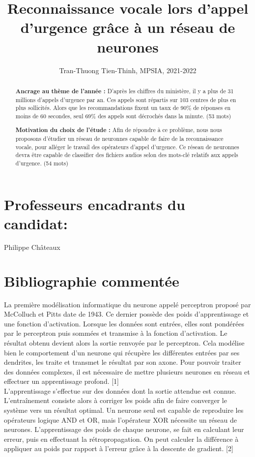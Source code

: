 \documentclass[12pt,a4paper, french]{article}
\title{Reconnaissance vocale lors d'appel d'urgence grâce à un réseau de neurones}
\author{Tran-Thuong Tien-Thinh, MPSIA, 2021-2022}
\date{}
\begin{document}
\maketitle

\begin{abstract}
\textbf{Ancrage au thème de l'année :}
D'après les chiffres du ministère, il y a plus de 31 millions d'appels d'urgence par an. Ces appels sont répartis sur 103 centres de plus en plus sollicités. Alors que les recommandations fixent un taux de 90\% de réponses en moins de 60 secondes, seul 69\% des appels sont décrochés dans la minute.  (53 mots)

\textbf{Motivation du choix de l’étude :} Afin de répondre à ce problème, nous nous proposons d'étudier un réseau de neuronnes capable de faire de la reconnaissance vocale, pour alléger le travail des opérateurs d'appel d'urgence. Ce réseau de neuronnes devra être capable de classifier des fichiers audios selon des mots-clé relatifs aux appels d’urgence. (54 mots)
\end{abstract}

\section*{Professeurs encadrants du candidat:}
Philippe Châteaux

\section*{Bibliographie commentée}
La première modélisation informatique du neurone appelé perceptron proposé par McColluch et Pitts date de 1943. Ce dernier possède des poids d'apprentissage et une fonction d’activation. Lorsque les données sont entrées, elles sont pondérées par le perceptron puis sommées et transmise à la fonction d’activation. Le résultat obtenu devient alors la sortie renvoyée par le perceptron. Cela modélise bien le comportement d’un neurone qui récupère les différentes entrées par ses dendrites, les traite et transmet le résultat par son axone. Pour pouvoir traiter des données complexes, il est nécessaire de mettre plusieurs neurones en réseau et effectuer un apprentissage profond. [1]
\\
L’apprentissage s'effectue sur des données dont la sortie attendue est connue. L’entraînement consiste alors à corriger les poids afin de faire converger le système vers un résultat optimal. Un neurone seul est capable de reproduire les opérateurs logique AND et OR, mais l'opérateur XOR nécessite un réseau de neurones. L'apprentissage des poids de chaque neurone, se fait en calculant leur erreur, puis en effectuant la rétropropagation. On peut calculer la différence à appliquer
au poids par rapport à l'erreur grâce à la descente de gradient. [2]
\end{document}
